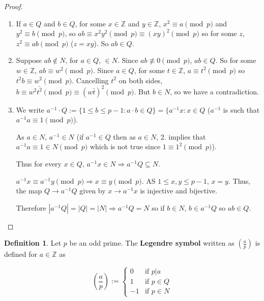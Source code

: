 \documentclass[12pt,a4paper]{article}
\theoremstyle{definition}
\newtheorem{definition}{Definition}[subsection]
\begin{document}
\begin{proof}
	\hfill
	\begin{enumerate}
		\item If $a \in Q$ and $b \in Q$, for some $x \in \mathbb{Z}$ and $y \in \mathbb{Z}$, $x^2 \equiv a \pmod{p}$ and $y^2 \equiv b \pmod{p}$, so $ab \equiv x^2 y^2 \pmod{p} \equiv (xy)^2 \pmod{p}$ so for some $z$, $z^2 \equiv ab \pmod{p}$ ($z = xy$). So $ab \in Q$.
		\item Suppose $ab \notin N$, for $a \in Q$, $ \in N$. Since $ab \not\equiv 0 \pmod{p}$, $ab \in Q$. So for some $w \in \mathbb{Z}$, $ab \equiv w^2 \pmod{p}$. Since $a \in Q$, for some $t \in \mathbb{Z}$, $a \equiv t^2 \pmod{p}$ so $t^2 b \equiv w^2 \pmod{p}$. Cancelling $t^2$ on both sides, $b \equiv w^2 \bar{t^2} \pmod{p} \equiv (w \bar{t})^2 \pmod{p}$. But $b \in N$, so we have a contradiction.
		\item We write $a^{-1} \cdot Q := \{1 \le b \le p - 1: a \cdot b \in Q\} = \{a^{-1}x: x \in Q$ ($a^{-1}$ is such that $a^{-1}a \equiv 1 \pmod{p}$).
		
		As $a \in N$, $a^{-1} \in N$ (if $a^{-1} \in Q$ then as $a \in N$, 2. implies that $a^{-1}a \equiv 1 \in N \pmod{p}$ which is not true since $1 \equiv 1^2 \pmod{p}$).

		Thus for every $x \in Q$, $a^{-1}x \in N \Rightarrow a^{-1}Q \subseteq N$.
		
		$a^{-1}x \equiv a^{-1}y \pmod{p} \Rightarrow x \equiv y \pmod{p}$. AS $1 \le x, y \le p - 1$, $x = y$. Thus, the map $Q \rightarrow a^{-1}Q$ given by $x \rightarrow a^{-1}x$ is injective and bijective.

		Therefore $|a^{-1}Q| = |Q| = |N| \Rightarrow a^{-1}Q = N$ so if $b \in N$, $b \in a^{-1}Q$ so $ab \in Q$.
	\end{enumerate}
\end{proof}

\begin{definition}
	Let $p$ be an odd prime. The \textbf{Legendre symbol} written as $(\frac{a}{p})$ is defined for $a \in \mathbb{Z}$ as

	\begin{equation}
		(\frac{a}{p}) :=
		\begin{cases}
			0 & \text{if } p | a\\
			1 & \text{if } p \in Q\\
			-1 & \text{if } p \in N
		\end{cases}
	\end{equation}
\end{definition}
\end{document}
